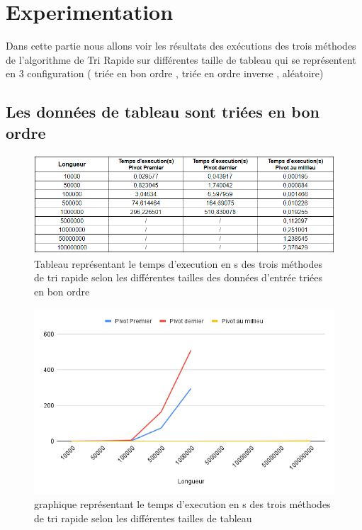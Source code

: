\section{Experimentation}
Dans cette partie nous allons voir les résultats des exécutions des trois méthodes de l'algorithme de Tri Rapide sur différentes taille de tableau qui se représentent en 3 configuration ( triée en bon ordre , triée en ordre inverse , aléatoire) 
\subsection{Les données de tableau sont triées en bon ordre}

 \begin{figure}[H]
    \centering
        \includegraphics[scale=0.7]{ressources/trieeT.PNG}
        \caption{Tableau représentant le temps d'execution en s des trois méthodes de tri rapide selon les différentes tailles des données d'entrée triées en bon ordre}
    \label{fig:fusion}
\end{figure}
\par
 \begin{figure}[H]
    \centering
        \includegraphics[scale=0.7]{ressources/triee.png}
        \caption{graphique représentant le temps d'execution en s des trois méthodes de tri rapide selon les différentes tailles de tableau}
    \label{fig:fusion}
\end{figure}


